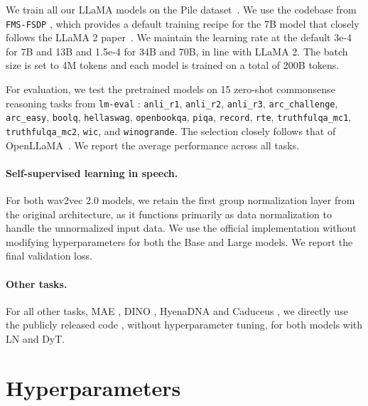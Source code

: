 We train all our LLaMA models on the Pile dataset~\citep{pile}. We use the codebase from \texttt{FMS-FSDP} \citep{fms-fsdp}, which provides a default training recipe for the 7B model that closely follows the LLaMA 2 paper~\citep{touvron2023llama2}. We maintain the learning rate at the default 3e-4 for 7B and 13B and 1.5e-4 for 34B and 70B, in line with LLaMA 2.
The batch size is set to 4M tokens
and each model is trained on a total of 200B tokens.


For evaluation, we test the pretrained models on 15 zero-shot commonsense reasoning tasks from \texttt{lm-eval} \citep{eval-harness}: \texttt{anli\_r1}, \texttt{anli\_r2}, \texttt{anli\_r3}, \texttt{arc\_challenge}, \texttt{arc\_easy}, \texttt{boolq}, \texttt{hellaswag}, \texttt{openbookqa}, \texttt{piqa}, \texttt{record}, \texttt{rte}, \texttt{truthfulqa\_mc1}, \texttt{truthfulqa\_mc2}, \texttt{wic}, and \texttt{winogrande}. The selection closely follows that of OpenLLaMA~\citep{openlm2023openllama}. We report the average performance across all tasks.



\paragraph{Self-supervised learning in speech.} For both wav2vec 2.0 models, we retain the first group normalization layer from the original architecture, as it functions primarily as data normalization to handle the unnormalized input data.
We use the official implementation \citep{wav2vec2} without modifying hyperparameters for both the Base and Large models. We report the final validation loss.

\paragraph{Other tasks.} For all other tasks, MAE \citep{he2022masked}, DINO \citep{caron2021emerging}, HyenaDNA \citep{nguyen2024hyenadna} and Caduceus \citep{schiff2024caduceus}, we directly use the publicly released code \citep{mae, dino, hyena, caduceus}, without hyperparameter tuning, for both models with LN and DyT.


\section{Hyperparameters}
\label{section:tuning}




